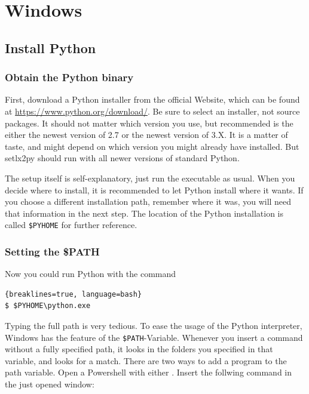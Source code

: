 \section{Windows}

\subsection{Install Python}

\subsubsection{Obtain the Python binary}

First, download a Python installer from the official Website, which can be found at \url{https://www.python.org/download/}. Be sure to select an installer, not source packages. It should not matter which version you use, but recommended is the either the newest version of 2.7 or the newest version of 3.X. It is a matter of taste, and might depend on which version you might already have installed. But setlx2py should run with all newer versions of standard Python.

The setup itself is self-explanatory, just run the executable as usual. When you decide where to install, it is recommended to let Python install where it wants. If you choose a different installation path, remember where it was, you will need that information in the next step. The location of the Python installation is called \texttt{\$PYHOME} for further reference.

\subsubsection{Setting the \$PATH}

Now you could run Python with the command

\begin{lstlisting}{breaklines=true, language=bash}
$ $PYHOME\python.exe
\end{lstlisting}

Typing the full path is very tedious. To ease the usage of the Python interpreter, Windows has the feature of the \texttt{\$PATH}-Variable. Whenever you insert a command without a fully specified path, it looks in the folders you specified in that variable, and looks for a match. There are two ways to add a program to the path variable. Open a Powershell with either . Insert the follwing command in the just opened window: 

